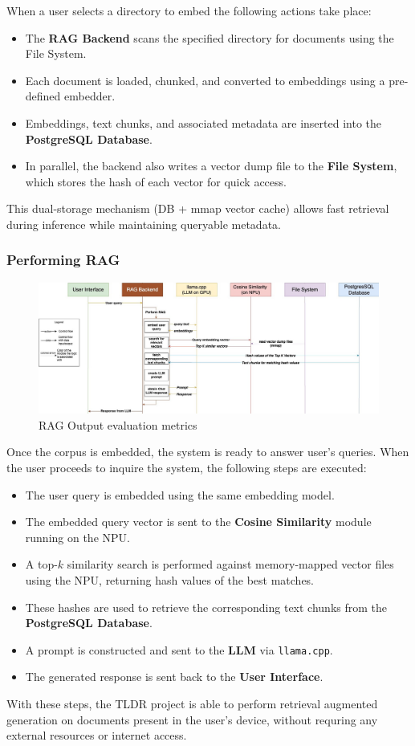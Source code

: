 When a user selects a directory to embed the following actions take place:
\begin{itemize}
    \item The \textbf{RAG Backend} scans the specified directory for documents using the File System.
    \item Each document is loaded, chunked, and converted to embeddings using a pre-defined embedder.
    \item Embeddings, text chunks, and associated metadata are inserted into the \textbf{PostgreSQL Database}.
    \item In parallel, the backend also writes a vector dump file to the \textbf{File System}, which stores the hash of each vector for quick access.
\end{itemize}
This dual-storage mechanism (DB + mmap vector cache) allows fast retrieval during inference while maintaining queryable metadata.

\subsubsection{Performing RAG}
\label{subsec:AppDesignWorkflow-PerformingRAG}
\begin{figure}[H]
    \centering
    \includegraphics[width=1.0\linewidth]{images/tldr-app-worklfow-pt3.jpg}
    \caption{RAG Output evaluation metrics ~\cite{cardenas2023rag}}
    \label{fig:autoregressive_decoding}
\end{figure}

Once the corpus is embedded, the system is ready to answer user's queries. When the user proceeds to inquire the system, the following steps are executed:

\begin{itemize}
    \item The user query is embedded using the same embedding model.
    \item The embedded query vector is sent to the \textbf{Cosine Similarity} module running on the NPU.
    \item A top-$k$ similarity search is performed against memory-mapped vector files using the NPU, returning hash values of the best matches.
    \item These hashes are used to retrieve the corresponding text chunks from the \textbf{PostgreSQL Database}.
    \item A prompt is constructed and sent to the \textbf{LLM} via \texttt{llama.cpp}.
    \item The generated response is sent back to the \textbf{User Interface}.
\end{itemize}


With these steps, the TLDR project is able to perform retrieval augmented generation on documents present in the user's device, without requring any external resources or internet access.
